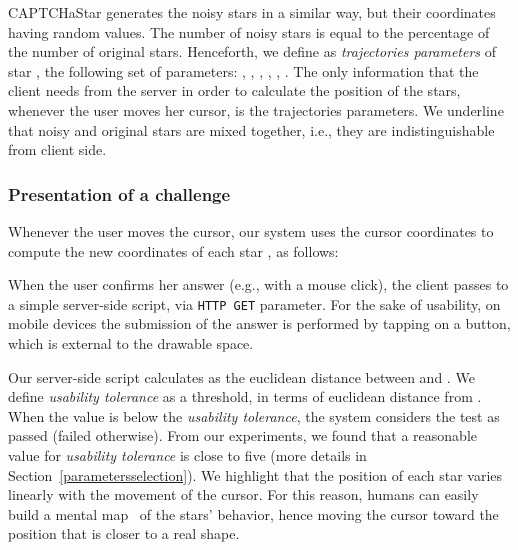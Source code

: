 \documentclass[conference]{IEEEtran}
\newcommand{\hilight}[1]{#1}
\begin{document}
CAPTCHaStar generates the noisy stars in a similar way, but their coordinates  having random values. The number of noisy stars is equal to the percentage  of the number of original stars.
Henceforth, we define as \textit{trajectories parameters} of star , the following set of parameters: , , , , , .
The only information that the client needs from the server in order to calculate the position of the stars, whenever the user moves her cursor, is the trajectories parameters.
We underline that noisy and original stars are mixed together, i.e., they are indistinguishable from client side. \subsubsection{Presentation of a challenge}
Whenever the user moves the cursor, our system uses the cursor coordinates  to compute the new coordinates of each star , as follows:

When the user 
confirms her answer (e.g., with a mouse click), the client passes  to a simple server-side script, via \texttt{HTTP GET} parameter.
For the sake of usability, on mobile devices the submission of the answer is performed by tapping on a button, which is external to the drawable space.

Our server-side script calculates  as the euclidean distance between  and .
We define \textit{usability tolerance} as a threshold, in terms of euclidean distance from . 
When the value  is below the \textit{usability tolerance}, the system considers the test as passed (failed otherwise).  
From our experiments, we found that a reasonable value for \textit{usability tolerance} is close to five \hilight{(more details in Section}~\ref{parametersselection}). We highlight that the position of each star varies linearly with the movement of the cursor.
For this reason, humans can easily build a mental map~\cite{norman2013design} of the stars' behavior, hence moving the cursor toward the position that is closer to a real shape.
\end{document}
